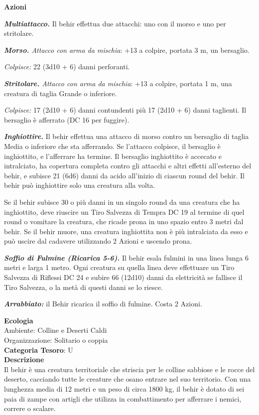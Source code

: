 \begin{multicols}{2}
{\textbf{Azioni}

\emph{\textbf{Multiattacco.}} Il behir effettua due attacchi: uno con il morso e uno per stritolare.

\emph{\textbf{Morso.} Attacco con arma da mischia}: +13 a colpire, portata 3 m, un bersaglio.

\emph{Colpisce:} 22 (3d10 + 6) danni perforanti.

\emph{\textbf{Stritolare.} Attacco con arma da mischia}: +13 a colpire, portata 1 m, una creatura di taglia Grande o inferiore.

\emph{Colpisce:} 17 (2d10 + 6) danni contundenti più 17 (2d10 + 6) danni taglienti. Il bersaglio è afferrato (DC 16 per fuggire).

\emph{\textbf{Inghiottire.}} Il behir effettua una attacco di morso contro un bersaglio di taglia Media o inferiore che sta afferrando. Se l'attacco colpisce, il bersaglio è inghiottito, e l'afferrare ha termine. Il bersaglio inghiottito è accecato e intralciato, ha copertura completa contro gli attacchi e altri effetti all'esterno del behir, e subisce 21 (6d6) danni da acido all'inizio di ciascun round del behir. Il behir può inghiottire solo una creatura alla volta.

Se il behir subisce 30 o più danni in un singolo round da una creatura che ha inghiottito, deve riuscire un Tiro Salvezza di Tempra DC 19 al termine di quel round o vomitare la creatura, che ricade prona in uno spazio entro 3 metri dal behir. Se il behir muore, una creatura inghiottita non è più intralciata da esso e può uscire dal cadavere utilizzando 2 Azioni e uscendo prona.

\emph{\textbf{Soffio di Fulmine (Ricarica 5-6).}} Il behir esala fulmini in una linea lunga 6 metri e larga 1 metro. Ogni creatura su quella linea deve effettuare un Tiro Salvezza di Riflessi DC 24 e subire 66 (12d10) danni da elettricità se fallisce il Tiro Salvezza, o la metà di questi danni se lo riesce.

\emph{\textbf{Arrabbiato:}} il Behir ricarica il soffio di fulmine. Costa 2 Azioni.

\textbf{Ecologia}\\
Ambiente: Colline e Deserti Caldi\\
Organizzazione: Solitario o coppia\\
\textbf{Categoria Tesoro}: U\\
\textbf{Descrizione}\\
Il behir è una creatura territoriale che striscia per le colline sabbiose e le rocce del deserto, cacciando tutte le creature che osano entrare nel suo territorio. Con una lunghezza media di 12 metri e un peso di circa 1800 kg, il behir è dotato di sei paia di zampe con artigli che utilizza in combattimento per afferrare i nemici, correre o scalare.

}
\end{multicols}
